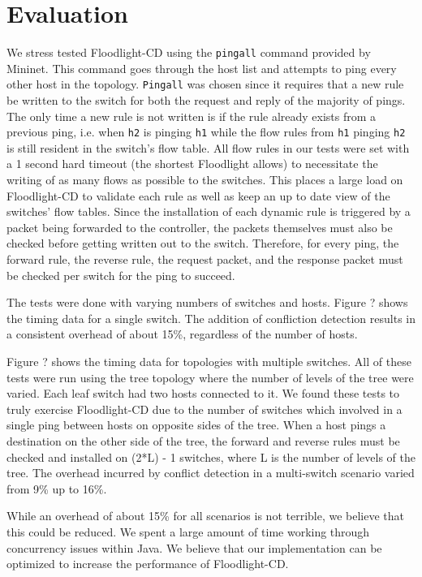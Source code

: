 \section{Evaluation}
\label{sec:evaluation}

We stress tested Floodlight-CD using the \texttt{pingall} command provided by Mininet.
This command goes through the host list and attempts to ping every other host in the topology.
\texttt{Pingall} was chosen since it requires that a new rule be written to the switch for both the request and reply of the majority of pings.
The only time a new rule is not written is if the rule already exists from a previous ping, i.e. when \texttt{h2} is pinging \texttt{h1} while the flow rules from \texttt{h1} pinging \texttt{h2} is still resident in the switch's flow table.
All flow rules in our tests were set with a 1 second hard timeout (the shortest Floodlight allows) to necessitate the writing of as many flows as possible to the switches.
This places a large load on Floodlight-CD to validate each rule as well as keep an up to date view of the switches' flow tables.
Since the installation of each dynamic rule is triggered by a packet being forwarded to the controller, the packets themselves must also be checked before getting written out to the switch.
Therefore, for every ping, the forward rule, the reverse rule, the request packet, and the response packet must be checked per switch for the ping to succeed.

The tests were done with varying numbers of switches and hosts.
Figure ? shows the timing data for a single switch. %
The addition of confliction detection results in a consistent overhead of about 15\%, regardless of the number of hosts.

Figure ? shows the timing data for topologies with multiple switches.
All of these tests were run using the tree topology where the number of levels of the tree were varied.
Each leaf switch had two hosts connected to it.
We found these tests to truly exercise Floodlight-CD due to the number of switches which involved in a single ping between hosts on opposite sides of the tree.
When a host pings a destination on the other side of the tree, the forward and reverse rules must be checked and installed on (2*L) - 1 switches, where L is the number of levels of the tree. 
The overhead incurred by conflict detection in a multi-switch scenario varied from 9\% up to 16\%.

While an overhead of about 15\% for all scenarios is not terrible, we believe that this could be reduced.
We spent a large amount of time working through concurrency issues within Java.
We believe that our implementation can be optimized to increase the performance of Floodlight-CD.

